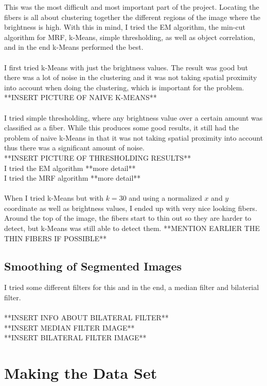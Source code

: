 \documentclass[11pt,psfig]{article}
\begin{document}
This was the most difficult and most important part of the project. Locating the fibers is all about clustering together the different regions of the image where the brightness is high. With this in mind, I tried the EM algorithm, the min-cut algorithm for MRF, k-Means, simple thresholding, as well as object correlation, and in the end k-Means performed the best. \\
\\
I first tried k-Means with just the brightness values. The result was good but there was a lot of noise in the clustering and it was not taking spatial proximity into account when doing the clustering, which is important for the problem. \\
**INSERT PICTURE OF NAIVE K-MEANS**\\
\\
I tried simple thresholding, where any brightness value over a certain amount was classified as a fiber. While this produces some good results, it still had the problem of naive k-Means in that it was not taking spatial proximity into account thus there was a significant amount of noise. \\
**INSERT PICTURE OF THRESHOLDING RESULTS**\\
I tried the EM algorithm **more detail**\\
I tried the MRF algorithm **more detail**\\
\\
When I tried k-Means but with $k=30$ and using a normalized $x$ and $y$ coordinate as well as brightness values, I ended up with very nice looking fibers. Around the top of the image, the fibers start to thin out so they are harder to detect, but k-Means was still able to detect them. **MENTION EARLIER THE THIN FIBERS IF POSSIBLE**

\subsection*{Smoothing of Segmented Images}

I tried some different filters for this and in the end, a median filter and bilaterial filter. \\
\\
**INSERT INFO ABOUT BILATERAL FILTER**
\\
**INSERT MEDIAN FILTER IMAGE**
\\
**INSERT BILATERAL FILTER IMAGE**

\section*{Making the Data Set}
\end{document}

